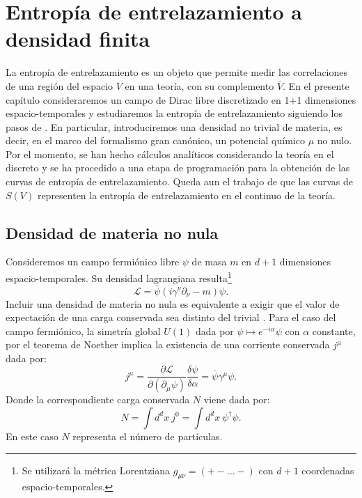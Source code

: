 \chapter{Entropía de entrelazamiento a densidad finita}\label{cap4}

La entropía de entrelazamiento es un objeto que permite medir las correlaciones de una región del espacio $V$ en una teoría, con su complemento $\bar{V}$. En el presente capítulo consideraremos un campo de Dirac libre discretizado en 1+1 dimensiones espacio-temporales y estudiaremos la entropía de entrelazamiento siguiendo los pasos de \cite{Casini:2009sr}. En particular, introduciremos una densidad no trivial de materia, es decir, en el marco del formalismo gran canónico, un potencial químico $\mu$ no nulo. Por el momento, se han hecho cálculos analíticos considerando la teoría en el discreto y se ha procedido a una etapa de programación para la obtención de las curvas de entropía de entrelazamiento. Queda aun el trabajo de que las curvas de $S(V)$ representen la entropía de entrelazamiento en el continuo de la teoría. 

\section{Densidad de materia no nula}
Consideremos un campo fermiónico libre $\psi$ de masa $m$ en $d+1$ dimensiones espacio-temporales. Su densidad lagrangiana resulta\footnote{Se utilizará la métrica Lorentziana $g_{\mu \nu}=(+-\ldots -)$ con $d+1$ coordenadas espacio-temporales.}
\begin{equation}
\mathcal{L}=\bar{\psi}(i\gamma^{\nu}\partial_{\nu}-m)\psi.
\label{eq:lag_libre}
\end{equation}
Incluir una densidad de materia no nula es equivalente a exigir que el valor de expectación de una carga conservada sea distinto del trivial \cite{Solis:2016}. Para el caso del campo fermiónico, la simetría global $U(1)$ dada por $\psi \mapsto e^{-i\alpha}\psi$ con $\alpha$ constante, por el teorema de Noether implica la existencia de una corriente conservada $j^{\mu}$ dada por:
\begin{equation}
j^{\mu}=\frac{\partial \mathcal{L}}{\partial(\partial_{\mu}\psi)}\frac{\delta \psi }{\delta \alpha}=\bar{\psi}\gamma ^{\mu}\psi.
\end{equation}
Donde la correspondiente carga conservada $N$ viene dada por:
\begin{equation}
N=\int d^dx\:j^0=\int d^dx \:\psi^{\dag}\psi.
\end{equation}
En este caso $N$ representa el número de partículas.\\

